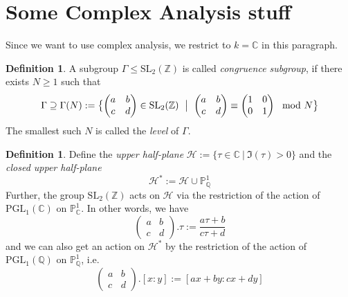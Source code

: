 \documentclass{scrartcl}
\newcommand{\Z}{\mathbb{Z}}
\newcommand{\C}{\mathbb{C}}
\newcommand{\Proj}{\mathbb{P}}
\newcommand{\Half}{\mathcal{H}}
\newcommand{\SL}{\mathrm{SL}}
\theoremstyle{definition}
\newtheorem{definition}[prop]{Definition}
\begin{document}
\section{Some Complex Analysis stuff}
Since we want to use complex analysis, we restrict to $k = \C$ in this paragraph.
\begin{definition}
    A subgroup $\Gamma \leq \SL_2(\Z)$ is called \emph{congruence subgroup}, if there exists $N \geq 1$ such that
    \begin{equation*}
        \Gamma \supseteq \Gamma(N) := \bigl\{ \left(\begin{matrix} a & b \\ c & d \end{matrix}\right) \in \SL_2(\Z) \ \bigm| \ \left(\begin{matrix} a & b \\ c & d \end{matrix}\right) \equiv \left(\begin{matrix} 1 & 0 \\ 0 & 1 \end{matrix}\right) \mod N \bigr\}
    \end{equation*}
    The smallest such $N$ is called the \emph{level} of $\Gamma$.
\end{definition}
\begin{definition}
    Define the \emph{upper half-plane} $\Half := \{ \tau \in \C \ | \ \Im(\tau) > 0 \}$ and the \emph{closed upper half-plane}
    \begin{equation*}
        \Half^* := \Half \cup \Proj_{\mathbb{Q}}^1
    \end{equation*}
    Further, the group $\SL_2(\Z)$ acts on $\Half$ via the restriction of the action of $\mathrm{PGL}_1(\C)$ on $\Proj_{\C}^1$.
    In other words, we have
    \begin{equation*}
        \left(\begin{matrix}
            a & b \\ c & d
        \end{matrix}\right).\tau := \frac {a\tau + b} {c\tau + d}
    \end{equation*}
    and we can also get an action on $\Half^*$ by the restriction of the action of $\mathrm{PGL}_1(\mathbb{Q})$ on $\mathbb{P}_{\mathbb{Q}}^1$, i.e.
    \begin{equation*}
        \left(\begin{matrix}
            a & b \\ c & d
        \end{matrix}\right).[ x : y ] := [ ax + by : cx + dy ]
    \end{equation*}
\end{definition}
\end{document}
